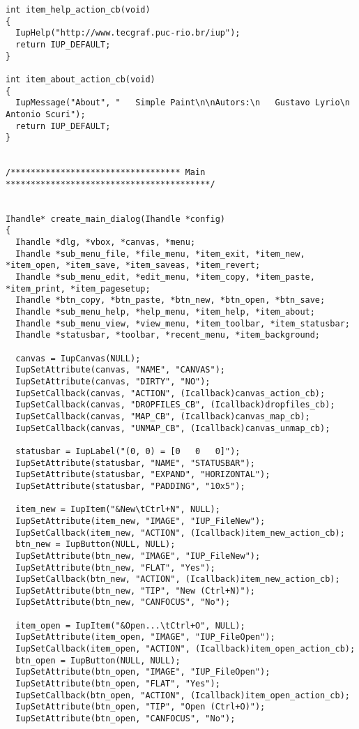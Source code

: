 \documentclass{ctexart}
\begin{document}
\begin{lstlisting}
int item_help_action_cb(void)
{
  IupHelp("http://www.tecgraf.puc-rio.br/iup");
  return IUP_DEFAULT;
}

int item_about_action_cb(void)
{
  IupMessage("About", "   Simple Paint\n\nAutors:\n   Gustavo Lyrio\n   Antonio Scuri");
  return IUP_DEFAULT;
}


/********************************** Main *****************************************/


Ihandle* create_main_dialog(Ihandle *config)
{
  Ihandle *dlg, *vbox, *canvas, *menu;
  Ihandle *sub_menu_file, *file_menu, *item_exit, *item_new, *item_open, *item_save, *item_saveas, *item_revert;
  Ihandle *sub_menu_edit, *edit_menu, *item_copy, *item_paste, *item_print, *item_pagesetup;
  Ihandle *btn_copy, *btn_paste, *btn_new, *btn_open, *btn_save;
  Ihandle *sub_menu_help, *help_menu, *item_help, *item_about;
  Ihandle *sub_menu_view, *view_menu, *item_toolbar, *item_statusbar;
  Ihandle *statusbar, *toolbar, *recent_menu, *item_background;

  canvas = IupCanvas(NULL);
  IupSetAttribute(canvas, "NAME", "CANVAS");
  IupSetAttribute(canvas, "DIRTY", "NO");
  IupSetCallback(canvas, "ACTION", (Icallback)canvas_action_cb);
  IupSetCallback(canvas, "DROPFILES_CB", (Icallback)dropfiles_cb);
  IupSetCallback(canvas, "MAP_CB", (Icallback)canvas_map_cb);
  IupSetCallback(canvas, "UNMAP_CB", (Icallback)canvas_unmap_cb);

  statusbar = IupLabel("(0, 0) = [0   0   0]");
  IupSetAttribute(statusbar, "NAME", "STATUSBAR");
  IupSetAttribute(statusbar, "EXPAND", "HORIZONTAL");
  IupSetAttribute(statusbar, "PADDING", "10x5");

  item_new = IupItem("&New\tCtrl+N", NULL);
  IupSetAttribute(item_new, "IMAGE", "IUP_FileNew");
  IupSetCallback(item_new, "ACTION", (Icallback)item_new_action_cb);
  btn_new = IupButton(NULL, NULL);
  IupSetAttribute(btn_new, "IMAGE", "IUP_FileNew");
  IupSetAttribute(btn_new, "FLAT", "Yes");
  IupSetCallback(btn_new, "ACTION", (Icallback)item_new_action_cb);
  IupSetAttribute(btn_new, "TIP", "New (Ctrl+N)");
  IupSetAttribute(btn_new, "CANFOCUS", "No");

  item_open = IupItem("&Open...\tCtrl+O", NULL);
  IupSetAttribute(item_open, "IMAGE", "IUP_FileOpen");
  IupSetCallback(item_open, "ACTION", (Icallback)item_open_action_cb);
  btn_open = IupButton(NULL, NULL);
  IupSetAttribute(btn_open, "IMAGE", "IUP_FileOpen");
  IupSetAttribute(btn_open, "FLAT", "Yes");
  IupSetCallback(btn_open, "ACTION", (Icallback)item_open_action_cb);
  IupSetAttribute(btn_open, "TIP", "Open (Ctrl+O)");
  IupSetAttribute(btn_open, "CANFOCUS", "No");


\end{lstlisting}
\end{document}
